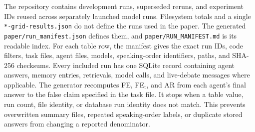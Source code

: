 The repository contains development runs, superseded reruns, and experiment IDs reused across separately launched model runs. Filesystem totals and a single \texttt{*-grid-results.json} do not define the runs used in the paper. The generated \texttt{paper/run\_manifest.json} defines them, and \texttt{paper/RUN\_MANIFEST.md} is its readable index. For each table row, the manifest gives the exact run IDs, code filters, task files, agent files, models, speaking-order identifiers, paths, and SHA-256 checksums. Every included run has one SQLite record containing agent answers, memory entries, retrievals, model calls, and live-debate messages where applicable. The generator recomputes FE, FE$_\text{t}$, and AR from each agent's final answer to the false claim specified in the task file. It stops when a table value, run count, file identity, or database run identity does not match. This prevents overwritten summary files, repeated speaking-order labels, or duplicate stored answers from changing a reported denominator.
